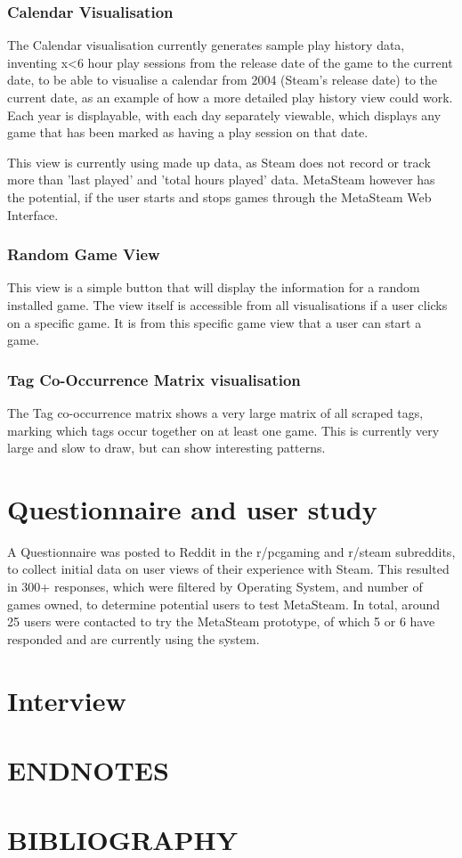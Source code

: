 \documentclass[11pt]{article}
\begin{document}
\subsubsection*{Calendar Visualisation}
The Calendar visualisation currently generates sample play history data, inventing x<6 hour play sessions from the release date of the game to the current date, to be able to visualise a calendar from 2004 (Steam's release date) to the current date, as an example of how a more detailed play history view could work. Each year is displayable, with each day separately viewable, which displays any game that has been marked as having a play session on that date.

This view is currently using made up data, as Steam does not record or track more than 'last played' and 'total hours played' data. MetaSteam however has the potential, if the user starts and stops games through the MetaSteam Web Interface. 

\subsubsection*{Random Game View}
This view is a simple button that will display the information for a random installed game. The view itself is accessible from all visualisations if a user clicks on a specific game. It is from this specific game view that a user can start a game.

\subsubsection*{Tag Co-Occurrence Matrix visualisation}
The Tag co-occurrence matrix shows a very large matrix of all scraped tags, marking which tags occur together on at least one game. This is currently very large and slow to draw, but can show interesting patterns.


\section{Questionnaire and user study} 
A Questionnaire was posted to Reddit in the r/pcgaming and r/steam subreddits, to collect initial data on user views of their experience with Steam. This resulted in 300+ responses, which were filtered by Operating System, and number of games owned, to determine potential users to test MetaSteam. In total, around 25 users were contacted to try the MetaSteam prototype, of which 5 or 6 have responded and are currently using the system.

\section{Interview}



\section*{ENDNOTES}
\theendnotes

\section*{BIBLIOGRAPHY}
\printbibliography
\end{document}
